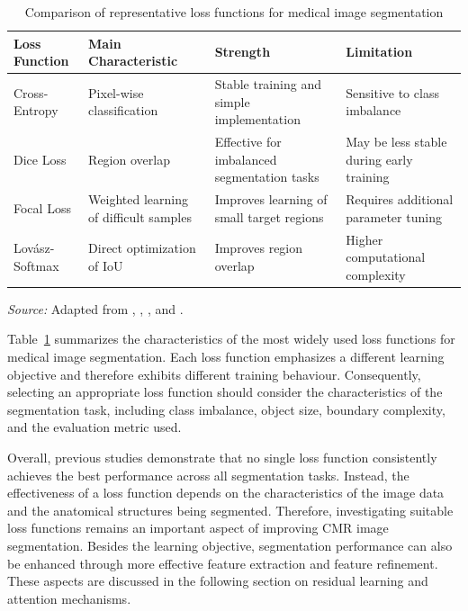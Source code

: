 \begin{table}[htbp]
	\centering
	\caption{Comparison of representative loss functions for medical image segmentation} %
	\label{tab:loss-functions}
	
	\small
	\renewcommand{\arraystretch}{1.2}
	\begin{tabular}{
			>{\raggedright\arraybackslash}p{}
			>{\raggedright\arraybackslash}p{}
			>{\raggedright\arraybackslash}p{}
			>{\raggedright\arraybackslash}p{}
		}
		\toprule
		\textbf{Loss Function} & \textbf{Main Characteristic} & \textbf{Strength} & \textbf{Limitation} \\ \midrule
		Cross-Entropy & Pixel-wise classification & Stable training and simple implementation & Sensitive to class imbalance \\
		Dice Loss & Region overlap & Effective for imbalanced segmentation tasks & May be less stable during early training \\
		Focal Loss & Weighted learning of difficult samples & Improves learning of small target regions & Requires additional parameter tuning \\
		Lov\'asz-Softmax & Direct optimization of IoU & Improves region overlap & Higher computational complexity \\ \bottomrule
	\end{tabular}
	
	\vspace{4pt}
	{\raggedright \footnotesize \textit{Source:} Adapted from \cite{Milletari2016}, \cite{Lin2017}, \cite{Berman2018}, and \cite{Jadon2020}.\par}
\end{table}

Table~\ref{tab:loss-functions} summarizes the characteristics of the most widely used loss functions for medical image segmentation. Each loss function emphasizes a different learning objective and therefore exhibits different training behaviour. Consequently, selecting an appropriate loss function should consider the characteristics of the segmentation task, including class imbalance, object size, boundary complexity, and the evaluation metric used.

Overall, previous studies demonstrate that no single loss function consistently achieves the best performance across all segmentation tasks. Instead, the effectiveness of a loss function depends on the characteristics of the image data and the anatomical structures being segmented. Therefore, investigating suitable loss functions remains an important aspect of improving CMR image segmentation. Besides the learning objective, segmentation performance can also be enhanced through more effective feature extraction and feature refinement. These aspects are discussed in the following section on residual learning and attention mechanisms.

